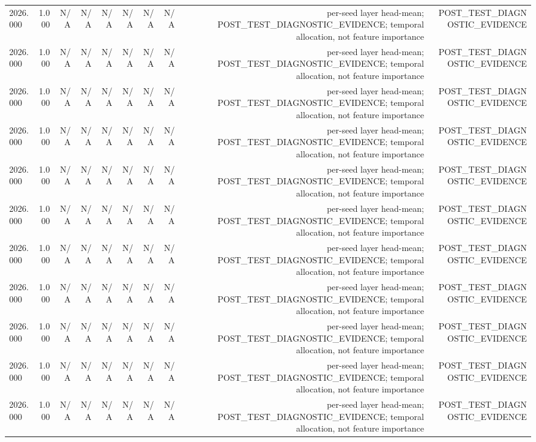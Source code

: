 \begin{table}[h!]
\begin{tabular}{lrrrrrrrrr}
2026.000 & 1.000 & N/A & N/A & N/A & N/A & N/A & N/A & per-seed layer head-mean; POST\_TEST\_DIAGNOSTIC\_EVIDENCE; temporal allocation, not feature importance & POST\_TEST\_DIAGNOSTIC\_EVIDENCE \\
2026.000 & 1.000 & N/A & N/A & N/A & N/A & N/A & N/A & per-seed layer head-mean; POST\_TEST\_DIAGNOSTIC\_EVIDENCE; temporal allocation, not feature importance & POST\_TEST\_DIAGNOSTIC\_EVIDENCE \\
2026.000 & 1.000 & N/A & N/A & N/A & N/A & N/A & N/A & per-seed layer head-mean; POST\_TEST\_DIAGNOSTIC\_EVIDENCE; temporal allocation, not feature importance & POST\_TEST\_DIAGNOSTIC\_EVIDENCE \\
2026.000 & 1.000 & N/A & N/A & N/A & N/A & N/A & N/A & per-seed layer head-mean; POST\_TEST\_DIAGNOSTIC\_EVIDENCE; temporal allocation, not feature importance & POST\_TEST\_DIAGNOSTIC\_EVIDENCE \\
2026.000 & 1.000 & N/A & N/A & N/A & N/A & N/A & N/A & per-seed layer head-mean; POST\_TEST\_DIAGNOSTIC\_EVIDENCE; temporal allocation, not feature importance & POST\_TEST\_DIAGNOSTIC\_EVIDENCE \\
2026.000 & 1.000 & N/A & N/A & N/A & N/A & N/A & N/A & per-seed layer head-mean; POST\_TEST\_DIAGNOSTIC\_EVIDENCE; temporal allocation, not feature importance & POST\_TEST\_DIAGNOSTIC\_EVIDENCE \\
2026.000 & 1.000 & N/A & N/A & N/A & N/A & N/A & N/A & per-seed layer head-mean; POST\_TEST\_DIAGNOSTIC\_EVIDENCE; temporal allocation, not feature importance & POST\_TEST\_DIAGNOSTIC\_EVIDENCE \\
2026.000 & 1.000 & N/A & N/A & N/A & N/A & N/A & N/A & per-seed layer head-mean; POST\_TEST\_DIAGNOSTIC\_EVIDENCE; temporal allocation, not feature importance & POST\_TEST\_DIAGNOSTIC\_EVIDENCE \\
2026.000 & 1.000 & N/A & N/A & N/A & N/A & N/A & N/A & per-seed layer head-mean; POST\_TEST\_DIAGNOSTIC\_EVIDENCE; temporal allocation, not feature importance & POST\_TEST\_DIAGNOSTIC\_EVIDENCE \\
2026.000 & 1.000 & N/A & N/A & N/A & N/A & N/A & N/A & per-seed layer head-mean; POST\_TEST\_DIAGNOSTIC\_EVIDENCE; temporal allocation, not feature importance & POST\_TEST\_DIAGNOSTIC\_EVIDENCE \\
2026.000 & 1.000 & N/A & N/A & N/A & N/A & N/A & N/A & per-seed layer head-mean; POST\_TEST\_DIAGNOSTIC\_EVIDENCE; temporal allocation, not feature importance & POST\_TEST\_DIAGNOSTIC\_EVIDENCE \\

\end{tabular}
\end{table}
